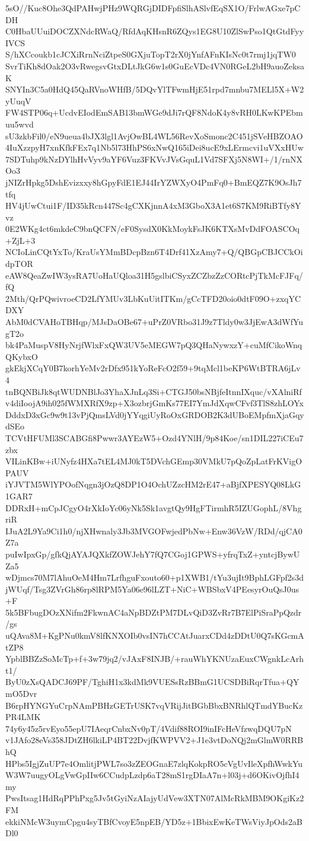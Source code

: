 5sO//Kuc8Ohe3QdPAHwjPHz9WQRGjDIDFpfiSlhASlvfEqSX1O/FrlwAGxe7pCDH
C0HbaUUuiDOCZXNdcRWaQ/RfdAqKHsnR6ZQys1EG8U10ZlSwPso1QtGtdFyyIVCS
S/hXCcoukb1cJCXiRrnNciZtpeS0GXjuTopT2rX0jYnfAFnKIsNc0t7rmj1jqTW0
SvrTiKh8dOak2O3vRwegsvGtxDLtJkG6w1s0GuEcVDc4VN0RGeL2bH9auoZeksaK
SNYIn3C5a0HdQ45QaRVnoWHfB/5DQvYlTFwmHjE51rpd7mnbu7MELl5X+W2yUuqV
FW4STP06q+UcdvEIodEmSAB13bmWGe9dJi7rQF8NdoK4y8vRH0LKwKPEbmuu5wvd
sU3zkbFil0/eN9ueua4bJX3lgl1AvjOwBL4WL56RevXoSmonc2C451jSVeHBZOAO
4IuXzzpyH7xnKfkFEx7q1Nb5l73HhPS6xNwQ165iDei8ucE9xLErmcvi1uVXxHUw
7SDTuhp9kNzDYlhHvVyv9aYF6Vuz3FKVvJVsGquL1Vd7SFXj5N8WI+/1/rnNXOo3
jNIZrHpkg5DshEvizxxy8hGpyFdE1EJ44IrYZWXyO4PmFq0+BmEQZ7K9OsJh7tfq
HV4jUwCtui1F/ID35kRcn447Sc4gCXKjnnA4xM3GboX3A1et6S7KM9RiBTfy8Yvz
0E2WKg4ct6mkdeC9bnQCFN/eF0SysdX0KkMoykFsJK6KTXsMvDdFOASCOq+ZjL+3
NCIoLinCQtYxTo/KraUsYMmBDcpBzn6T4Drf41XzAmy7+Q/QBGpCBJCCkOidpTOR
eAW8QeaZwIW3ysRA7UoHaUQloa31H5gslbiCSyxZCZbzZzCORtcPjTkMcFJFq/fQ
2Mth/QrPQwivroeCD2LfYMUv3LbKuUitITKm/gCcTFD20oio0dtF09O+zxqYCDXY
AbM0dCVAHoTBHqp/MJsDaOBe67+uPrZ0VRbo31J9z7Tldy0w3JjEwA3dWfYugT2o
bk4PaMuspV8HyNrjfWlxFxQW3UV5eMEGW7pQ3QHaNywxzY+cuMfCikoWnqQKybxO
gkEkjXCqY0B7korhYeMv2rDfx951kYoReFcO2f59+9tqMcl1beKP6WtBTRA6jLv4
tnBQNBiJk8qtWUDNBlJo3YhaXJnLq3Si+CTGJ50bsNBjfeItnnIXquc/vXAlniRf
v4diIoojA9ih025fWMXRfX9zp+X3ozbrjGmKs77EI7YmJdXqwCFvf3TlS8zhLOYx
DddxD3xGc9w9t13vPjQmsLVd0jYYqgiUyRoOxGRDOB2K3dUBoEMpfmXjaGqydSEo
TCVtHFUMl3SCABGfi8Pwwr3AYEzW5+Ozd4YNlH/9p84Koe/sn1DIL227iCEu7zbx
VILinKBw+iUNyfz4HXa7tEL4MJ0kT5DVchGEmp30VMkU7pQoZpLatFrKVigOPAUV
iYJVTM5WlYPOofNqgn3jOzQ8DP1O4OchUZzcHM2rE47+aBjfXPESYQ08LkG1GAR7
DDRxH+mCpJCgyO4rXkIoYc06yNk5Sk1avgtQy9HgFTirmhR5IZUGophL/8VhgriR
IJuA2L9Ya9Ci1h0/njXHwnaly3Jb3MVGOFwjedPbNw+Enw36VzW/RDd/qjCA0Z7a
puIwIpxGp/gfkQjAYAJQXkfZOWJehY7fQ7CGoj1GPWS+yfrqTxZ+yntcjBywUZa5
wDjmcs70M7lAhuOeM4Hm7LrfhguFxouto60+p1XWB1/tYu3ujIt9BphLGFpf2s3d
jWUqf/Tsg3ZVrGh86rp8lRPM5Ya06e96lLZT+NiC+WBSbxV4PEesyrOuQsJ0us+F
5k5BFbugDOzXNifm2FkwnAC4aNpBDZtPM7DLvQiD3ZvRr7B7ElPiSraPpQzdr/gs
uQAva8M+KgPNu0kmV8lfKNXOIb0vsIN7hCCAtJuarxCDd4zDDtU0Q7sKGcmAtZP8
YpblBBZzSoMcTp+f+3w79jq2/vJAxF8INJB/+rauWhYKNUzaEuxCWgnkLcArht1/
ByU0zXsQADCJ69PF/TghiH1x3kdMk9VUESsRzBBmG1UCSDBiRqrTfua+QYmO5Dvr
B6rpHYNGYuCrpNAmPBHzGETrUSK7vqVRijJitBGbBbxBNRhlQTmdYBucKzPR4LMK
74y6y45z5rvEyo55epU7IAeqrCnbxNv0pT/4Vdif88ROI9inIFcHeVfzwqDQU7pN
v1JAfo28eVs358JDtZH6lkiLP4BT22DvjfKWPVV2+J1e3vtDoNQj2mGlmW0RRBhQ
HPbs5IgjZuUP7e4OmlitjPWL7so3zZEOGnaE7zlqKokpRO5cVgUvIleXpfhWwkYu
W3W7uugyOLgVwGpIIw6CCudpLzdp6aT28mS1rgDIaA7n+l03j+d6OKivOjfhI4my
PwsItsag1HdRqPPhPxg5Jv5tGyiNzAIajyUdVew3XTN07AlMcRkMBM9OKgiKz2FM
ekkiNMcW3uymCpgu4syTBfCvoyE5npEB/YD5z+1BbixEwKeTWsViyJpOds2aBDl0
